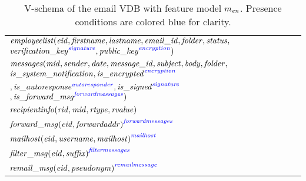 \begin{table}
\caption{V-schema of the email VDB with feature model
\ensuremath{\fModel_\enron}. 
Presence conditions are colored blue for clarity.
}
\label{tab:enron-vsch}
 \begin{center}
\small
\begin{tabular} {|l|}
\hline 
$\employees(\eid, \fname, \lname, \emailid, \folder, \status,$ 
$\annot[\fsignature]{\verificationkey},
  \annot[\fencryption]{\publickey})$\\
$\messages(\midatt, \sender, \dateatt, \messageid, \subject, \body, \folder,$ 
$\issystemnotification,
  \annot[\fencryption]{\isencrypted}$\\
\hspace{37pt} $ ,\annot[\fautoresponder]{\isautoresponse},\annot[\fsignature]{\issigned} $ 
  $,
  \annot[\fforwardmsg]{\isforwardmsg})$  \\
 $\recipientinfo(\rid, \midatt, \rtype, \rvalue)$ 
  \\ %
${\forwardmsg(\eid, \forwardaddr)}^{\fforwardmsg} $\\
${\mailhost(\eid, \username, \mailhost)}^{\fmailhost}$ 
\\
  ${\filtermsg(\eid, \suffix)}^{\ffiltermsg} $ \\
${\remailmsg(\eid, \pseudonym)}^{\fremailmsg}$  \\

\end{tabular}
\end{center}
\end{table}
